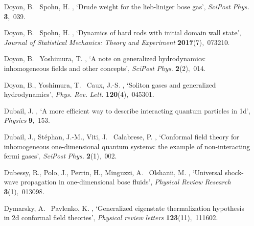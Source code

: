 \documentclass[onecolumn,amsfonts,showpacs,superscriptaddress]{revtex4-1}
\begin{document}
\begin{thebibliography}{xx}
Doyon, B. \harvardand\ Spohn, H.  \harvardyearright
  , `Drude weight for the lieb-liniger bose gas', {\em SciPost Phys.} {\bf
  3},~039.

Doyon, B. \harvardand\ Spohn, H.  \harvardyearright
  , `Dynamics of hard rods with initial domain wall state', {\em Journal of
  Statistical Mechanics: Theory and Experiment} {\bf 2017}(7),~073210.

Doyon, B. \harvardand\ Yoshimura, T.  \harvardyearright ,
  `A note on generalized hydrodynamics: inhomogeneous fields and other
  concepts', {\em SciPost Phys.} {\bf 2}(2),~014.

Doyon, B., Yoshimura, T. \harvardand\ Caux, J.-S.  \harvardyearleft
  2018\harvardyearright , `Soliton gases and generalized hydrodynamics', {\em
  Phys. Rev. Lett.} {\bf 120}(4),~045301.

Dubail, J.  \harvardyearright , `A more efficient way to
  describe interacting quantum particles in 1d', {\em Physics} {\bf 9},~153.

Dubail, J., St{\'e}phan, J.-M., Viti, J. \harvardand\ Calabrese, P.
  \harvardyearleft 2017\harvardyearright , `Conformal field theory for
  inhomogeneous one-dimensional quantum systems: the example of non-interacting
  fermi gases', {\em SciPost Phys.} {\bf 2}(1),~002.

Dubessy, R., Polo, J., Perrin, H., Minguzzi, A. \harvardand\ Olshanii, M.
  \harvardyearleft 2021\harvardyearright , `Universal shock-wave propagation in
  one-dimensional bose fluids', {\em Physical Review Research} {\bf
  3}(1),~013098.

Dymarsky, A. \harvardand\ Pavlenko, K.  \harvardyearright
  , `Generalized eigenstate thermalization hypothesis in 2d conformal field
  theories', {\em Physical review letters} {\bf 123}(11),~111602.


\end{thebibliography}
\end{document}
